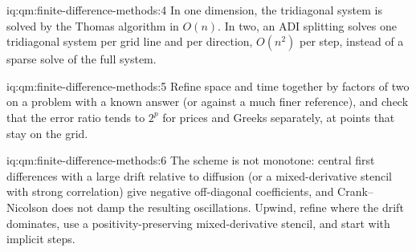 \begin{solution}{iq:qm:finite-difference-methods:4}
In one dimension, the tridiagonal system is solved by the Thomas algorithm in $O(n)$. In two, an ADI splitting solves one tridiagonal system per grid line and per direction, $O(n^2)$ per step, instead of
a sparse solve of the full system.
\end{solution}

\begin{solution}{iq:qm:finite-difference-methods:5}
Refine space and time together by factors of two on a problem with a known answer (or against a much finer reference), and check that the error ratio tends to $2^p$ for prices and Greeks separately,
at points that stay on the grid.
\end{solution}

\begin{solution}{iq:qm:finite-difference-methods:6}
The scheme is not monotone: central first differences with a large drift relative to diffusion (or a mixed-derivative stencil with strong correlation) give negative off-diagonal coefficients, and
Crank--Nicolson does not damp the resulting oscillations. Upwind, refine where the drift dominates, use a positivity-preserving mixed-derivative stencil, and start with implicit steps.
\end{solution}
